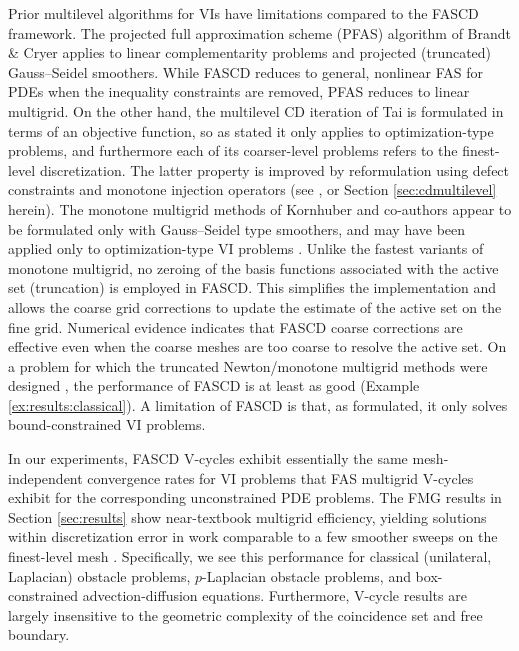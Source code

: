 \documentclass[review,hidelinks,onefignum,onetabnum]{siamart220329}
\begin{document}
Prior multilevel algorithms for VIs have limitations compared to the FASCD framework.  The projected full approximation scheme (PFAS) algorithm of Brandt \& Cryer \cite{BrandtCryer1983} applies to linear complementarity problems and projected (truncated) Gauss--Seidel smoothers.  While FASCD reduces to general, nonlinear FAS for PDEs when the inequality constraints are removed, PFAS reduces to linear multigrid.  On the other hand, the multilevel CD iteration of Tai \cite{Tai2003} is formulated in terms of an objective function, so as stated it only applies to optimization-type problems, and furthermore each of its coarser-level problems refers to the finest-level discretization.  The latter property is improved by reformulation using defect constraints and monotone injection operators (see \cite[Algorithm 4.2]{GraeserKornhuber2009}, or Section \ref{sec:cdmultilevel} herein).  The monotone multigrid methods of Kornhuber and co-authors \cite{GraeserKornhuber2009,Kornhuber1994} appear to be formulated only with Gauss--Seidel type smoothers, and may have been applied only to optimization-type VI problems \cite[for example]{JouvetGraeser2013}.  Unlike the fastest variants of monotone multigrid, no zeroing of the basis functions associated with the active set (truncation) is employed in FASCD.  This simplifies the implementation and allows the coarse grid corrections to update the estimate of the active set on the fine grid.  Numerical evidence indicates that FASCD coarse corrections are effective even when the coarse meshes are too coarse to resolve the active set.  On a problem for which the truncated Newton/monotone multigrid methods were designed \cite[problem 7.1.1]{GraeserKornhuber2009}, the performance of FASCD is at least as good (Example \ref{ex:results:classical}).  A limitation of FASCD is that, as formulated, it only solves bound-constrained VI problems.

In our experiments, FASCD V-cycles exhibit essentially the same mesh-independent convergence rates for VI problems that FAS multigrid V-cycles exhibit for the corresponding unconstrained PDE problems.  The FMG results in Section \ref{sec:results} show near-textbook multigrid efficiency, yielding solutions within discretization error in work comparable to a few smoother sweeps on the finest-level mesh \cite{BrandtLivne2011}.  Specifically, we see this performance for classical (unilateral, Laplacian) obstacle problems, $p$-Laplacian obstacle problems, and box-constrained advection-diffusion equations.  Furthermore, V-cycle results are largely insensitive to the geometric complexity of the coincidence set and free boundary.
\end{document}
